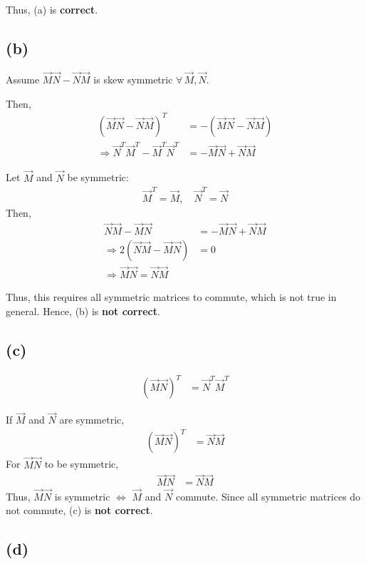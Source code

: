 \documentclass[12pt]{article}
\begin{document}
Thus, (a) is \textbf{correct}.

\subsection*{(b)}

Assume $\vec{M}\vec{N} - \vec{N}\vec{M}$ is skew symmetric $\forall \, \vec{M}, \vec{N}$.

Then,
\begin{align}
(\vec{M}\vec{N} - \vec{N}\vec{M})^T &= -(\vec{M}\vec{N} - \vec{N}\vec{M}) \\
\Rightarrow \vec{N}^T \vec{M}^T - \vec{M}^T \vec{N}^T &= -\vec{M}\vec{N} + \vec{N}\vec{M}
\end{align}

Let $\vec{M}$ and $\vec{N}$ be symmetric:
\begin{align}
\vec{M}^T = \vec{M}, \quad \vec{N}^T = \vec{N}
\end{align}
Then,
\begin{align}
\vec{N}\vec{M} - \vec{M}\vec{N} &= -\vec{M}\vec{N} + \vec{N}\vec{M} \\
\Rightarrow 2(\vec{N}\vec{M} - \vec{M}\vec{N}) &= 0 \\
\Rightarrow \vec{M}\vec{N} = \vec{N}\vec{M}
\end{align}

Thus, this requires all symmetric matrices to commute, which is not true in general.  
Hence, (b) is \textbf{not correct}.

\subsection*{(c)}

\begin{align}
(\vec{M}\vec{N})^T &= \vec{N}^T \vec{M}^T
\end{align}

If $\vec{M}$ and $\vec{N}$ are symmetric,
\begin{align}
(\vec{M}\vec{N})^T &= \vec{N}\vec{M}
\end{align}
For $\vec{M}\vec{N}$ to be symmetric,  
\begin{align}
\vec{M}\vec{N} &= \vec{N}\vec{M}
\end{align}
Thus, $\vec{M}\vec{N}$ is symmetric $\iff$ $\vec{M}$ and $\vec{N}$ commute.  
Since all symmetric matrices do not commute, (c) is \textbf{not correct}.

\subsection*{(d)}
\end{document}
